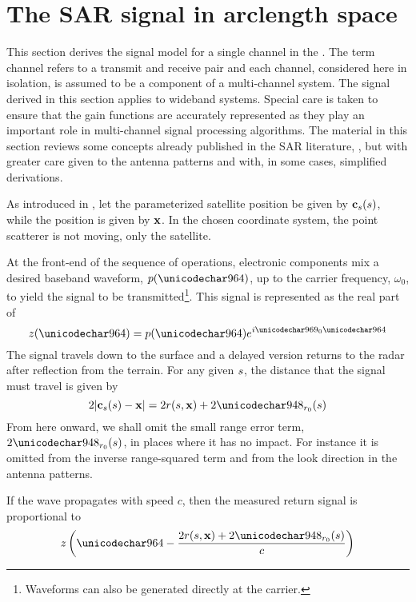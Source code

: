 \section{The SAR signal in arclength space}
\label{sc:sararc}
This section derives the signal model for a single channel in the . The term channel refers to a transmit and receive pair and each channel, considered here in isolation, is assumed to be a component of a multi-channel system. The signal derived in this section applies to \gls{wideband} systems. Special care is taken to ensure that the  gain functions are accurately represented as they play an important role in multi-channel signal processing algorithms. The material in this section reviews some concepts already published in the SAR literature, \cite{Cumming2003, Cumming2005, Franc99, Raney1992, Bamler1992}, but with greater care given to the antenna patterns and with, in some cases, simplified derivations.
\par
As introduced in \cite{EnderSignalTheoretic}, let the parameterized satellite position be given by $\mathbf{c}_s(s)$, while the  position is given by $\mathbf{\mathbf{x}}$. In the chosen coordinate system, the point scatterer is not moving, only the satellite.
\par
At the front-end of the sequence of operations, electronic components mix a desired baseband waveform, $\envelope(\fasttime)$, up to the carrier frequency, $\omega_0$, to yield the signal to be transmitted\footnote{Waveforms can also be generated directly at the carrier.}. This signal is represented as the real part of
\begin{equation}
 \pulse(\fasttime)=\envelope(\fasttime)\eex{\im\omega_0\fasttime}
\end{equation}
The signal travels down to the surface and a delayed version returns to the radar after reflection from the terrain. For any given $s$, the distance that the signal must travel is given by
\begin{equation}
 2\magVec{\sats(\parm)-\vct\target} = 2\amplitude\range(\parm, \targetnoparm)+2\rangeErrorZero(\parm)
\end{equation}
From here onward, we shall omit the small range error term, $2\rangeErrorZero(\parm)$, in places where it has no impact. For instance it is omitted from the inverse range-squared term and from the look direction in the antenna patterns.
\par
If the wave propagates with speed $c$, then the measured return signal is proportional to
\begin{equation}
 \pulse\left(\fasttime-\frac{2\amplitude\range(\parm, \targetnoparm)+2\rangeErrorZero(\parm)}{c}\right)
\end{equation}
